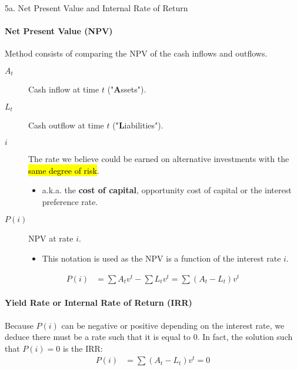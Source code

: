 \begin{CHPT_SUMM_AUTO}[label = {L.-5a}]{5a. Net Present Value and Internal Rate of Return}
\paragraph{Net Present Value (NPV)}
Method consists of comparing the NPV of the cash inflows and outflows.
\begin{description}
	\item[$A_{t}$]	Cash inflow at time $t$ ("\textbf{A}ssets").
	\item[$L_{t}$]	Cash outflow at time $t$ ("\textbf{L}iabilities").
	\item[$i$]	The rate we believe could be earned on alternative investments with the \hl{same degree of risk}.
		\begin{itemize}[leftmargin = *]
		\item	a.k.a. the \textbf{cost of capital}, opportunity cost of capital or the interest preference rate.
		\end{itemize}
	\item[$P(i)$]	NPV at rate $i$.
		\begin{itemize}[leftmargin = *]
		\item	This notation is used as the NPV is a function of the interest rate $i$.
		\end{itemize}
\end{description}
\begin{align*}
	P(i)
	&=	\sum A_{t} v^{t} - \sum L_{t} v^{t}
	=	\sum (A_{t} - L_{t}) v^{t}
\end{align*}

\tcbline

\paragraph{Yield Rate or Internal Rate of Return (IRR)}
Because $P(i)$ can be negative or positive depending on the interest rate, we deduce there must be a rate such that it is equal to $0$. In fact, the solution such that $P(i) = 0$ is the IRR:
\begin{align*}
	P(i)
	&=	\sum (A_{t} - L_{t}) v^{t}
	=	0
\end{align*}

\tcbline


\end{CHPT_SUMM_AUTO}
